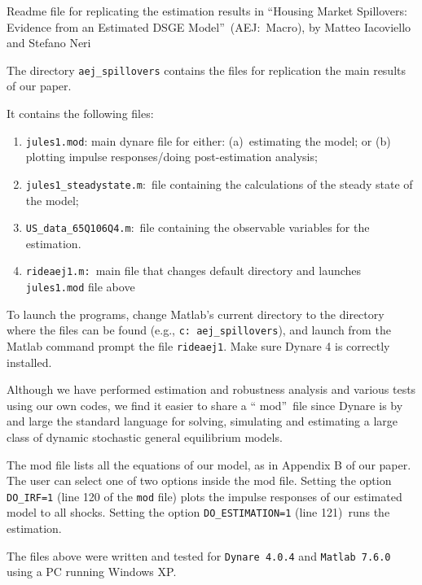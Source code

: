 \documentclass[12pt]{article}
\begin{document}
%

{\Large Readme file for replicating the estimation results in
\textquotedblleft Housing Market Spillovers: Evidence from an Estimated DSGE
Model\textquotedblright\ (AEJ:\ Macro), by Matteo Iacoviello and Stefano Neri%
}

The directory \texttt{aej\_spillovers} contains the files for replication
the main results of our paper.

It contains the following files:

\begin{enumerate}
\item \texttt{jules1.mod}: main dynare file for either: (a)\ estimating the
model; or (b) plotting impulse responses/doing post-estimation analysis;

\item \texttt{jules1\_steadystate.m}:\ file containing the calculations of
the steady state of the model;

\item \texttt{US\_data\_65Q106Q4.m}:\ file containing the observable
variables for the estimation.

\item \texttt{rideaej1.m:\ }main file that changes default directory and
launches \texttt{jules1.mod} file above
\end{enumerate}

To launch the programs, change Matlab's current directory to the directory
where the files can be found (e.g., \texttt{c:\TEXTsymbol{\backslash}%
aej\_spillovers}), and launch from the Matlab command prompt the file 
\texttt{rideaej1}. Make sure Dynare 4 is correctly installed.

Although we have performed estimation and robustness analysis and various
tests using our own codes, we find it easier to share a \textquotedblleft
mod\textquotedblright\ file since Dynare is by and large the standard
language for solving, simulating and estimating a large class of dynamic
stochastic general equilibrium models.

The mod file lists all the equations of our model, as in Appendix B of our
paper. The user can select one of two options inside the mod file. Setting
the option \texttt{DO\_IRF=1} (line 120 of the \texttt{mod} file) plots the
impulse responses of our estimated model to all shocks. Setting the option 
\texttt{DO\_ESTIMATION=1} (line 121)\ runs the estimation.

The files above were written and tested for \texttt{Dynare 4.0.4} and 
\texttt{Matlab 7.6.0} using a PC running Windows XP.
\end{document}

